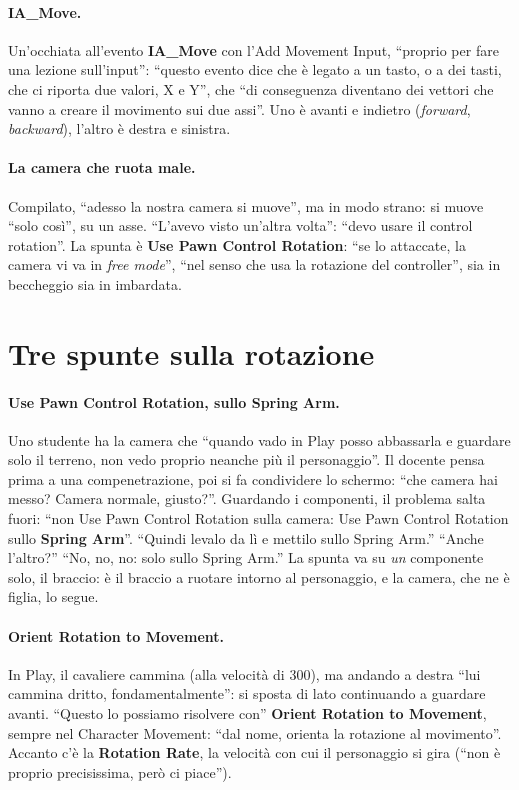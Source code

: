 \paragraph{IA\_Move.} Un'occhiata all'evento \textbf{IA\_Move} con l'Add Movement Input,
``proprio per fare una lezione sull'input'': ``questo evento dice che è legato a un
tasto, o a dei tasti, che ci riporta due valori, X e Y'', che ``di conseguenza diventano
dei vettori che vanno a creare il movimento sui due assi''. Uno è avanti e indietro
(\emph{forward}, \emph{backward}), l'altro è destra e sinistra.

\paragraph{La camera che ruota male.} Compilato, ``adesso la nostra camera si muove'', ma
in modo strano: si muove ``solo così'', su un asse. ``L'avevo visto un'altra volta'':
``devo usare il control rotation''. La spunta è \textbf{Use Pawn Control Rotation}:
``se lo attaccate, la camera vi va in \emph{free mode}'', ``nel senso che usa la
rotazione del controller'', sia in beccheggio sia in imbardata.

\section{Tre spunte sulla rotazione}
\label{ue9:sec:rotazioni}

\paragraph{Use Pawn Control Rotation, sullo Spring Arm.} Uno studente ha la camera che
``quando vado in Play posso abbassarla e guardare solo il terreno, non vedo proprio
neanche più il personaggio''. Il docente pensa prima a una compenetrazione, poi si fa
condividere lo schermo: ``che camera hai messo? Camera normale, giusto?''. Guardando i
componenti, il problema salta fuori: ``non Use Pawn Control Rotation sulla camera: Use
Pawn Control Rotation sullo \textbf{Spring Arm}''. ``Quindi levalo da lì e mettilo sullo
Spring Arm.'' ``Anche l'altro?'' ``No, no, no: solo sullo Spring Arm.'' La spunta va su
\emph{un} componente solo, il braccio: è il braccio a ruotare intorno al personaggio, e
la camera, che ne è figlia, lo segue.

\paragraph{Orient Rotation to Movement.} In Play, il cavaliere cammina (alla velocità di
300), ma andando a destra ``lui cammina dritto, fondamentalmente'': si sposta di lato
continuando a guardare avanti. ``Questo lo possiamo risolvere con'' \textbf{Orient
Rotation to Movement}, sempre nel Character Movement: ``dal nome, orienta la rotazione al
movimento''. Accanto c'è la \textbf{Rotation Rate}, la velocità con cui il personaggio si
gira (``non è proprio precisissima, però ci piace'').

